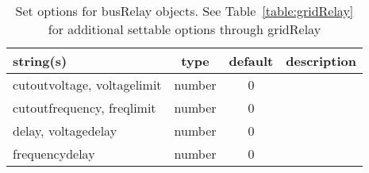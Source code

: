 \begin{table}[ht]
\centering
\begin{tabular}{p{5cm} c c p{7cm}}
\hline
string(s) & type & default & description \\
\hline
cutoutvoltage, voltagelimit & number & 0 & \\
cutoutfrequency, freqlimit & number & 0 & \\
delay, voltagedelay & number & 0 & \\
frequencydelay & number & 0 & \\
\hline
\end{tabular}
\caption{Set options for busRelay objects. See Table~\ref{table:gridRelay} for additional settable options through gridRelay}
\label{table:busRelay}
\end{table}

